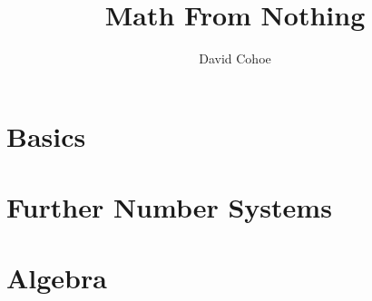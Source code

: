 \documentclass[12pt]{memoir}
\author{David Cohoe}
\title{Math From Nothing}
\date{}
\begin{document}
\maketitle

\tableofcontents



\part{Basics}








\part{Further Number Systems}








\part{Algebra}







\end{document}
